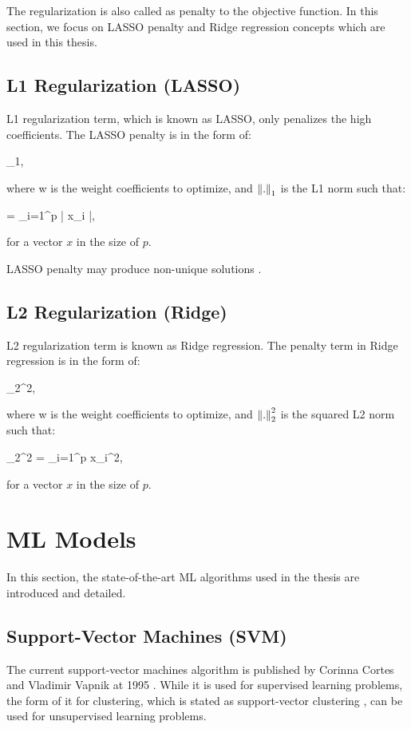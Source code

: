 The regularization is also called as penalty to the objective function. In this section, we focus on LASSO penalty and Ridge regression concepts which are used in this thesis.

\subsection{L1 Regularization (LASSO)}

L1 regularization term, which is known as LASSO, only penalizes the high coefficients. The LASSO penalty is in the form of:

\be
\label{eq:lasso_term}
\lambda {}_{1},
\ee

where w is the weight coefficients to optimize, and $\left\lVert.\right\rVert_{1}$ is the L1 norm such that:

\be
\label{eq:l1_norm}
 = \sum_{i=1}^{p} | x_{i} |,
\ee

for a vector $x$ in the size of $p$.

LASSO penalty may produce non-unique solutions \cite{lasso_penalty}.

\subsection{L2 Regularization (Ridge)}

L2 regularization term is known as Ridge regression. The penalty term in Ridge regression is in the form of:

\be
\label{eq:ridge_term}
\lambda {}_{2}^{2},
\ee

where w is the weight coefficients to optimize, and $\left\lVert.\right\rVert_{2}^{2}$ is the squared L2 norm such that:

\be
\label{eq:l2_norm}
_{2}^{2} = \sum_{i=1}^{p} x_{i}^2,
\ee

for a vector $x$ in the size of $p$.

\section{ML Models}

In this section, the state-of-the-art ML algorithms used in the thesis are introduced and detailed.

\subsection{Support-Vector Machines (SVM)}

The current support-vector machines algorithm is published by Corinna Cortes and Vladimir Vapnik at 1995 \cite{svm_original}. While it is used for supervised learning problems, the form of it for clustering, which is stated as support-vector clustering \cite{support_vector_clustering}, can be used for unsupervised learning problems.

